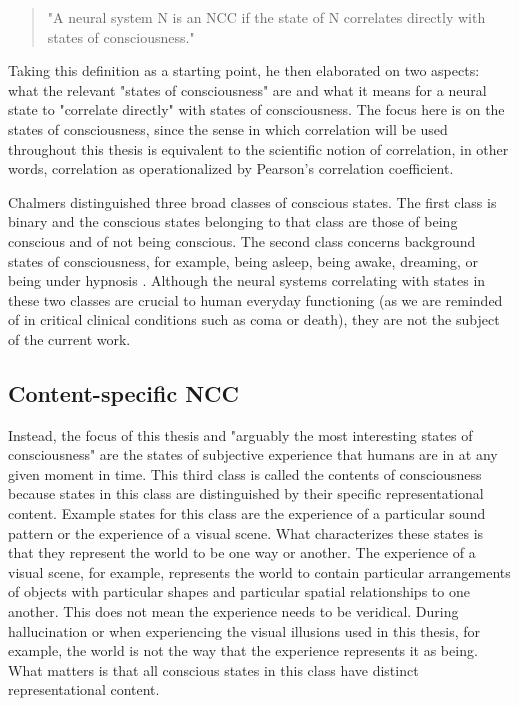 \begin{quotation}
"A neural system N is an NCC if the state of N correlates directly with states of consciousness." \parencite[p. 3]{Chalmers2000}
\end{quotation}

Taking this definition as a starting point, he then elaborated on two aspects: what the relevant "states of consciousness" are and what it means for a neural state to "correlate directly" with states of consciousness. The focus here is on the states of consciousness, since the sense in which correlation will be used throughout this thesis is equivalent to the scientific notion of correlation, in other words, correlation as operationalized by Pearson's correlation coefficient.

Chalmers \parencite*{Chalmers2000} distinguished three broad classes of conscious states. The first class is binary and the conscious states belonging to that class are those of being conscious and of not being conscious. The second class concerns background states of consciousness, for example, being asleep, being awake, dreaming, or being under hypnosis \parencite{Chalmers2000}. Although the neural systems correlating with states in these two classes are crucial to human everyday functioning (as we are reminded of in critical clinical conditions such as coma or death), they are not the subject of the current work.

\subsection{Content-specific NCC}
Instead, the focus of this thesis and "arguably the most interesting states of consciousness" \parencite[p. 4]{Chalmers2000} are the states of subjective experience that humans are in at any given moment in time. This third class is called the contents of consciousness because states in this class are distinguished by their specific representational content. Example states for this class are the experience of a particular sound pattern or the experience of a visual scene. What characterizes these states is that they represent the world to be one way or another. The experience of a visual scene, for example, represents the world to contain particular arrangements of objects with particular shapes and particular spatial relationships to one another. This does not mean the experience needs to be veridical. During hallucination or when experiencing the visual illusions used in this thesis, for example, the world is not the way that the experience represents it as being. What matters is that all conscious states in this class have distinct representational content.

